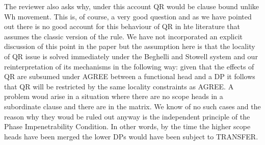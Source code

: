 \documentclass[11pt]{article}
\begin{document}
The reviewer also asks why, under this account QR would be clause bound unlike Wh movement. This is, of course, a very good question and as we have pointed out there is no good account for this behaviour of QR in hte literature that assumes the classic version of the rule.   We have not incorporated an explicit discussion of this point in the paper but the assumption here is that the locality of QR issue is solved immediately under the Beghelli and Stowell system and our reinterpretation of its mechanisms in the following way: given that the effects of QR are subsumed under AGREE between a functional head and a DP it follows that QR will be restricted by the same locality constraints as AGREE.  A problem woud arise in a situation where there are no scope heads in a subordinate clause and there are in the matrix.  We know of no such cases and the reason why they woud be ruled out anyway is the independent principle of the Phase Impenetrability Condition.  In other words, by the time the higher scope heads have been merged the lower DPs would have been subject to TRANSFER.  
\end{document}
